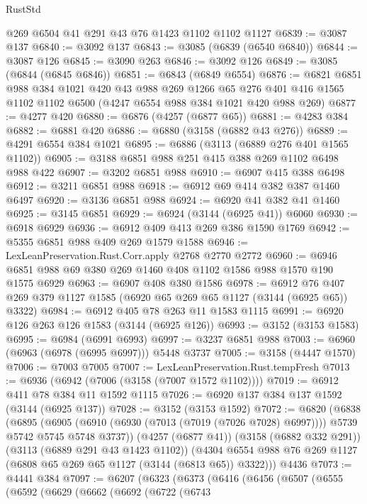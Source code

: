 \begin{lexlean}{RustStd}
\begin{coremodule}
{\begin{coremodule}
{{{{{{{{{{{{{{{{{{{{{{{{{{    @269
    @6504
    @41
    @291
    @43
    @76
    @1423
    @1102
    @1102
    @1127
@6839 := @3087 @137
@6840 := @3092 @137
@6843 := @3085 (@6839 (@6540 @6840))
@6844 := @3087 @126
@6845 := @3090 @263
@6846 := @3092 @126
@6849 := @3085 (@6844 (@6845 @6846))
@6851 := @6843 (@6849 @6554)
@6876 := @6821
    @6851
    @988
    @384
    @1021
    @420
    @43
    @988
    @269
    @1266
    @65
    @276
    @401
    @416
    @1565
    @1102
    @1102
    @6500
    (@4247 @6554 @988 @384 @1021 @420 @988 @269)
@6877 := @4277 @420
@6880 := @6876 (@4257 (@6877 @65))
@6881 := @4283 @384
@6882 := @6881 @420
@6886 := @6880 (@3158 (@6882 @43 @276))
@6889 := @4291 @6554 @384 @1021
@6895 := @6886 (@3113 (@6889 @276 @401 @1565 @1102))
@6905 := @3188 @6851 @988 @251 @415 @388 @269 @1102 @6498 @988 @422
@6907 := @3202 @6851 @988
@6910 := @6907 @415 @388 @6498
@6912 := @3211 @6851 @988
@6918 := @6912 @69 @414 @382 @387 @1460 @6497
@6920 := @3136 @6851 @988
@6924 := @6920 @41 @382 @41 @1460
@6925 := @3145 @6851
@6929 := @6924 (@3144 (@6925 @41)) @6060
@6930 := @6918 @6929
@6936 := @6912 @409 @413 @269 @386 @1590 @1769
@6942 := @5355 @6851 @988 @409 @269 @1579 @1588
@6946 := LexLeanPreservation.Rust.Corr.apply @2768 @2770 @2772
@6960 := @6946 @6851 @988 @69 @380 @269 @1460 @408 @1102 @1586 @988 @1570 @190 @1575 @6929
@6963 := @6907 @408 @380 @1586
@6978 := @6912 @76 @407 @269 @379 @1127 @1585 (@6920 @65 @269 @65 @1127 (@3144 (@6925 @65)) @3322)
@6984 := @6912 @405 @78 @263 @11 @1583 @1115
@6991 := @6920 @126 @263 @126 @1583 (@3144 (@6925 @126))
@6993 := @3152 (@3153 @1583)
@6995 := @6984 (@6991 @6993)
@6997 := @3237 @6851 @988
@7003 := @6960 (@6963 (@6978 (@6995 @6997))) @5448 @3737
@7005 := @3158 (@4447 @1570)
@7006 := @7003 @7005
@7007 := LexLeanPreservation.Rust.tempFresh
@7013 := @6936 (@6942 (@7006 (@3158 (@7007 @1572 @1102))))
@7019 := @6912 @411 @78 @384 @11 @1592 @1115
@7026 := @6920 @137 @384 @137 @1592 (@3144 (@6925 @137))
@7028 := @3152 (@3153 @1592)
@7072 := @6820
    (@6838
      (@6895
        (@6905 (@6910 (@6930 (@7013 (@7019 (@7026 @7028) @6997)))) @5739 @5742 @5745 @5748 @3737))
      (@4257 (@6877 @41))
      (@3158 (@6882 @332 @291))
      (@3113 (@6889 @291 @43 @1423 @1102))
      (@4304 @6554 @988 @76 @269 @1127 (@6808 @65 @269 @65 @1127 (@3144 (@6813 @65)) @3322)))
    @4436
@7073 := @4441 @384
@7097 := @6207
    (@6323
      (@6373
        (@6416
          (@6456
            (@6507
              (@6555
                (@6592
                  (@6629
                    (@6662
                      (@6692
                        (@6722
                          (@6743
}}}}}}}}}}}}}}}}}}}}}}}}}}
\end{coremodule}}
\end{coremodule}
\end{lexlean}
